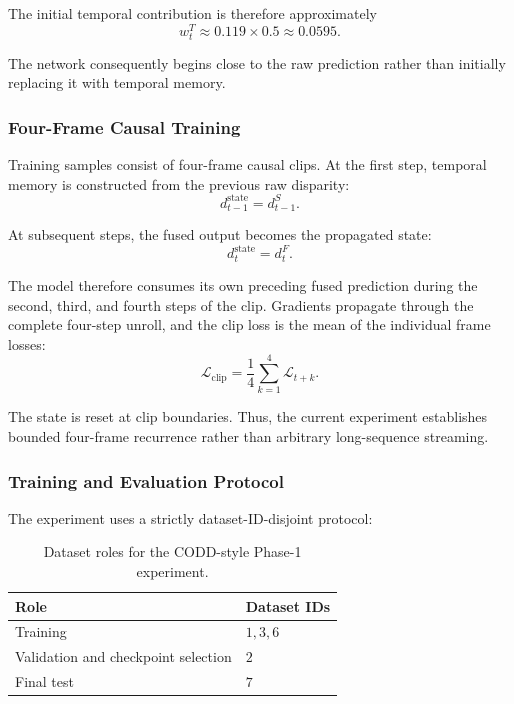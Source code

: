 \documentclass[11pt,a4paper]{article}
\begin{document}
The initial temporal contribution is therefore approximately
\begin{equation}
    w_t^{T}
    \approx
    0.119\times0.5
    \approx
    0.0595.
\end{equation}

The network consequently begins close to the raw prediction rather than initially replacing
it with temporal memory.

\subsubsection{Four-Frame Causal Training}

Training samples consist of four-frame causal clips. At the first step, temporal memory is
constructed from the previous raw disparity:
\begin{equation}
    d_{t-1}^{\mathrm{state}}
    =
    d_{t-1}^{S}.
\end{equation}

At subsequent steps, the fused output becomes the propagated state:
\begin{equation}
    d_t^{\mathrm{state}}
    =
    d_t^{F}.
\end{equation}

The model therefore consumes its own preceding fused prediction during the second, third,
and fourth steps of the clip. Gradients propagate through the complete four-step unroll,
and the clip loss is the mean of the individual frame losses:
\begin{equation}
    \mathcal{L}_{\mathrm{clip}}
    =
    \frac{1}{4}
    \sum_{k=1}^{4}
    \mathcal{L}_{t+k}.
\end{equation}

The state is reset at clip boundaries. Thus, the current experiment establishes bounded
four-frame recurrence rather than arbitrary long-sequence streaming.

\subsubsection{Training and Evaluation Protocol}

The experiment uses a strictly dataset-ID-disjoint protocol:
\begin{table}[t]
    \centering
    \caption{Dataset roles for the CODD-style Phase-1 experiment.}
    \label{tab:codd_style_split}
    \begin{tabular}{ll}
        \toprule
        Role & Dataset IDs \\
        \midrule
        Training & \(1,3,6\) \\
        Validation and checkpoint selection & \(2\) \\
        Final test & \(7\) \\
        \bottomrule
    \end{tabular}
\end{table}
\end{document}
